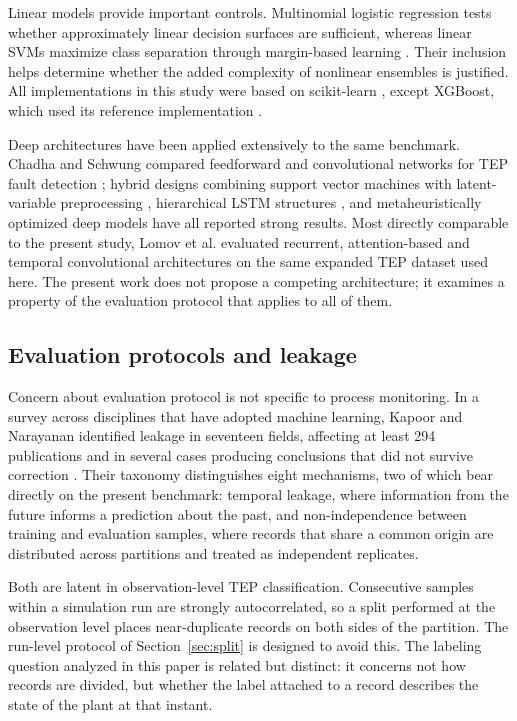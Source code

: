 \documentclass[10pt,twocolumn,a4paper]{article}
\begin{document}
Linear models provide important controls. Multinomial logistic regression tests
whether approximately linear decision surfaces are sufficient, whereas linear
SVMs maximize class separation through margin-based learning
\cite{cortes1995svm}. Their inclusion helps determine whether the added
complexity of nonlinear ensembles is justified. All implementations in this
study were based on scikit-learn \cite{pedregosa2011sklearn}, except XGBoost,
which used its reference implementation \cite{chen2016xgboost}.

Deep architectures have been applied extensively to the same benchmark. Chadha
and Schwung compared feedforward and convolutional networks for TEP fault
detection \cite{chadha2017comparison}; hybrid designs combining support vector
machines with latent-variable preprocessing \cite{gao2016svm}, hierarchical
LSTM structures \cite{agarwal2022lstm}, and metaheuristically optimized deep
models \cite{anitha2023imvoa} have all reported strong results. Most directly
comparable to the present study, Lomov et al. \cite{lomov2021temporal}
evaluated recurrent, attention-based and temporal convolutional architectures
on the same expanded TEP dataset used here. The present work does not propose
a competing architecture; it examines a property of the evaluation protocol
that applies to all of them.

\subsection{Evaluation protocols and leakage}

Concern about evaluation protocol is not specific to process monitoring. In a
survey across disciplines that have adopted machine learning, Kapoor and
Narayanan identified leakage in seventeen fields, affecting at least 294
publications and in several cases producing conclusions that did not survive
correction \cite{kapoor2023leakage}. Their taxonomy distinguishes eight
mechanisms, two of which bear directly on the present benchmark: temporal
leakage, where information from the future informs a prediction about the past,
and non-independence between training and evaluation samples, where records
that share a common origin are distributed across partitions and treated as
independent replicates.

Both are latent in observation-level TEP classification. Consecutive samples
within a simulation run are strongly autocorrelated, so a split performed at
the observation level places near-duplicate records on both sides of the
partition. The run-level protocol of Section~\ref{sec:split} is designed to
avoid this. The labeling question analyzed in this paper is related but
distinct: it concerns not how records are divided, but whether the label
attached to a record describes the state of the plant at that instant.
\end{document}
